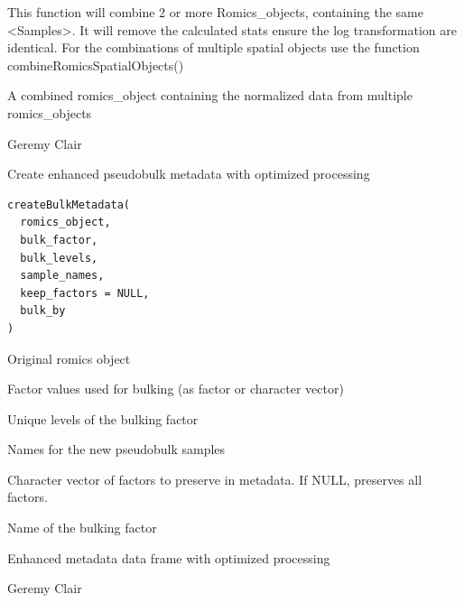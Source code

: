 \documentclass[a4paper]{book}
\begin{document}
%
\begin{Details}
This function will combine 2 or more Romics\_objects, containing the same <Samples>. It will remove the calculated stats ensure the log transformation are identical. For the combinations of multiple spatial objects use the function combineRomicsSpatialObjects()
\end{Details}
%
\begin{Value}
A combined romics\_object containing the normalized data from multiple romics\_objects
\end{Value}
%
\begin{Author}
Geremy Clair
\end{Author}
%
\begin{Description}
Create enhanced pseudobulk metadata with optimized processing
\end{Description}
%
\begin{Usage}
\begin{verbatim}
createBulkMetadata(
  romics_object,
  bulk_factor,
  bulk_levels,
  sample_names,
  keep_factors = NULL,
  bulk_by
)
\end{verbatim}
\end{Usage}
%
\begin{Arguments}
\begin{ldescription}
\item[\code{romics\_object}] Original romics object

\item[\code{bulk\_factor}] Factor values used for bulking (as factor or character vector)

\item[\code{bulk\_levels}] Unique levels of the bulking factor

\item[\code{sample\_names}] Names for the new pseudobulk samples

\item[\code{keep\_factors}] Character vector of factors to preserve in metadata. If NULL, preserves all factors.

\item[\code{bulk\_by}] Name of the bulking factor
\end{ldescription}
\end{Arguments}
%
\begin{Value}
Enhanced metadata data frame with optimized processing
\end{Value}
%
\begin{Author}
Geremy Clair
\end{Author}
\end{document}
